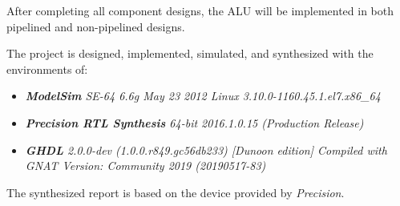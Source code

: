 After completing all component designs, the ALU will be implemented in both pipelined and non-pipelined designs.

\noindent The project is designed, implemented, simulated, and synthesized with the environments of:
\begin{itemize}
	\item \textit{\textbf{ModelSim} SE-64 6.6g May 23 2012 Linux 3.10.0-1160.45.1.el7.x86\_64}
	\item \textit{\textbf{Precision RTL Synthesis}  64-bit 2016.1.0.15 (Production Release)}
	\item \textit{\textbf{GHDL} 2.0.0-dev (1.0.0.r849.gc56db233) [Dunoon edition] Compiled with GNAT Version: Community 2019 (20190517-83)}
\end{itemize}

\noindent The synthesized report is based on the  device provided by \textit{Precision}.
